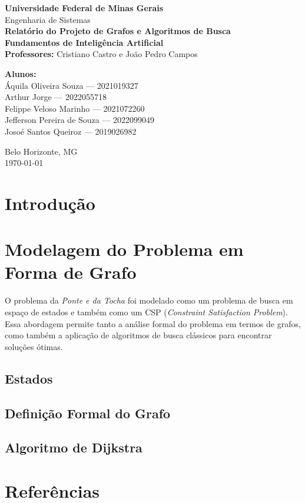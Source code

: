 \documentclass[12pt,a4paper]{article}
\begin{document}
\begin{titlepage}
    \centering
    {\Large \textbf{Universidade Federal de Minas Gerais}}\\[0.3cm]
    {\large Engenharia de Sistemas}\\[2cm]
    
    {\Huge \textbf{Relatório do Projeto de Grafos e Algoritmos de Busca}}\\[1.5cm]
    
    \textbf{Fundamentos de Inteligência Artificial}\\[0.5cm]
    \textbf{Professores:} Cristiano Castro e João Pedro Campos\\[1.5cm]
    
    \begin{flushleft}
        \textbf{Alunos:}\\
        Áquila Oliveira Souza --- 2021019327\\
        Arthur Jorge --- 2022055718\\
        Felippe Veloso Marinho --- 2021072260\\
        Jefferson Pereira de Souza --- 2022099049\\
        Josoé Santos Queiroz --- 2019026982
    \end{flushleft}
    
    \vfill
    {\large Belo Horizonte, MG}\\
    {\large \today}
\end{titlepage}

\clearpage
\tableofcontents
\clearpage

\section{Introdução}

\section{Modelagem do Problema em Forma de Grafo}

O problema da \textit{Ponte e da Tocha} foi modelado como um problema de busca em espaço de estados e também como um CSP (\textit{Constraint Satisfaction Problem}). Essa abordagem permite tanto a análise formal do problema em termos de grafos, como também a aplicação de algoritmos de busca clássicos para encontrar soluções ótimas. 

\subsection{Estados}
\subsection{Definição Formal do Grafo}

\subsection{Algoritmo de Dijkstra}
\section{Referências}
\clearpage
{}


\end{document}
